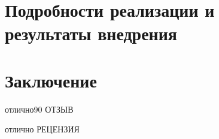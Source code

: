 \documentclass{fefu}
\begin{document}
    \section{Подробности реализации и результаты внедрения}
    
    \newpage
    \section*{Заключение}
    
    \newpage
    \printbibliography
    \newpage
    \begin{supervisorreview}{отлично}{90}{}
    	ОТЗЫВ
    \end{supervisorreview}
    \begin{review}{отлично}{}
    	РЕЦЕНЗИЯ
    \end{review}
\end{document}
